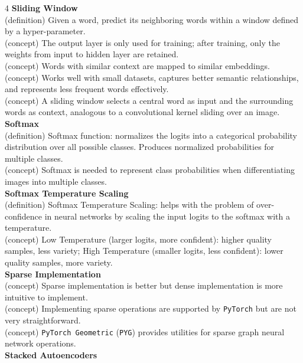 \documentclass[8pt]{extarticle}
\begin{document}
\begin{multicols}{4}
\vspace{2pt}\textbf{Sliding Window}\\
(definition) Given a word, predict its neighboring words within a window defined by a hyper-parameter.\\
(concept) The output layer is only used for training; after training, only the weights from input to hidden layer are retained.\\
(concept) Words with similar context are mapped to similar embeddings.\\
(concept) Works well with small datasets, captures better semantic relationships, and represents less frequent words effectively.\\
(concept) A sliding window selects a central word as input and the surrounding words as context, analogous to a convolutional kernel sliding over an image.\\
\vspace{2pt}\textbf{Softmax}\\
(definition) Softmax function: normalizes the logits into a categorical probability distribution over all possible classes. Produces normalized probabilities for multiple classes.\\
(concept) Softmax is needed to represent class probabilities when differentiating images into multiple classes.\\
\vspace{2pt}\textbf{Softmax Temperature Scaling}\\
(definition) Softmax Temperature Scaling: helps with the problem of over-confidence in neural networks by scaling the input logits to the softmax with a temperature.\\
(concept) Low Temperature (larger logits, more confident): higher quality samples, less variety; High Temperature (smaller logits, less confident): lower quality samples, more variety.\\
\vspace{2pt}\textbf{Sparse Implementation}\\
(concept) Sparse implementation is better but dense implementation is more intuitive to implement.\\
(concept) Implementing sparse operations are supported by \texttt{PyTorch} but are not very straightforward.\\
(concept) \texttt{PyTorch\ Geometric} (\texttt{PYG}) provides utilities for sparse graph neural network operations.\\
\vspace{2pt}\textbf{Stacked Autoencoders}\\

\end{multicols}
\end{document}
